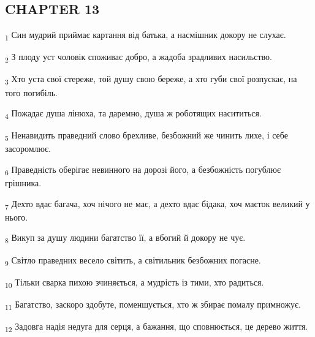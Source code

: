 \subsection{CHAPTER 13}
\begin{tcolorbox}
\textsubscript{1} Син мудрий приймає картання від батька, а насмішник докору не слухає.
\end{tcolorbox}
\begin{tcolorbox}
\textsubscript{2} З плоду уст чоловік споживає добро, а жадоба зрадливих насильство.
\end{tcolorbox}
\begin{tcolorbox}
\textsubscript{3} Хто уста свої стереже, той душу свою береже, а хто губи свої розпускає, на того погибіль.
\end{tcolorbox}
\begin{tcolorbox}
\textsubscript{4} Пожадає душа лінюха, та даремно, душа ж роботящих насититься.
\end{tcolorbox}
\begin{tcolorbox}
\textsubscript{5} Ненавидить праведний слово брехливе, безбожний же чинить лихе, і себе засоромлює.
\end{tcolorbox}
\begin{tcolorbox}
\textsubscript{6} Праведність оберігає невинного на дорозі його, а безбожність погублює грішника.
\end{tcolorbox}
\begin{tcolorbox}
\textsubscript{7} Дехто вдає багача, хоч нічого не має, а дехто вдає бідака, хоч маєток великий у нього.
\end{tcolorbox}
\begin{tcolorbox}
\textsubscript{8} Викуп за душу людини багатство її, а вбогий й докору не чує.
\end{tcolorbox}
\begin{tcolorbox}
\textsubscript{9} Світло праведних весело світить, а світильник безбожних погасне.
\end{tcolorbox}
\begin{tcolorbox}
\textsubscript{10} Тільки сварка пихою зчиняється, а мудрість із тими, хто радиться.
\end{tcolorbox}
\begin{tcolorbox}
\textsubscript{11} Багатство, заскоро здобуте, поменшується, хто ж збирає помалу примножує.
\end{tcolorbox}
\begin{tcolorbox}
\textsubscript{12} Задовга надія недуга для серця, а бажання, що сповнюється, це дерево життя.
\end{tcolorbox}
